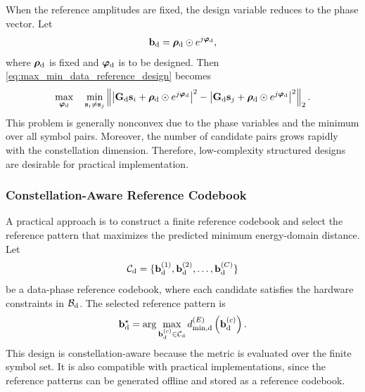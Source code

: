 \documentclass[journal]{IEEEtran}
\begin{document}
When the reference amplitudes are fixed, the design variable reduces to the phase vector. 
Let
\begin{equation}
\mathbf{b}_{\rm d}
=
\boldsymbol{\rho}_{\rm d}
\odot
e^{j\boldsymbol{\varphi}_{\rm d}},
\label{eq:data_reference_phase_parameterization}
\end{equation}
where $\boldsymbol{\rho}_{\rm d}$ is fixed and $\boldsymbol{\varphi}_{\rm d}$ is to be designed. 
Then \eqref{eq:max_min_data_reference_design} becomes
\begin{equation}
\max_{\boldsymbol{\varphi}_{\rm d}}
\quad
\min_{\mathbf{s}_i\neq\mathbf{s}_j}
\left\|
\left|
\mathbf{G}_{\rm d}\mathbf{s}_i+
\boldsymbol{\rho}_{\rm d}\odot e^{j\boldsymbol{\varphi}_{\rm d}}
\right|^2
-
\left|
\mathbf{G}_{\rm d}\mathbf{s}_j+
\boldsymbol{\rho}_{\rm d}\odot e^{j\boldsymbol{\varphi}_{\rm d}}
\right|^2
\right\|_2.
\label{eq:phase_only_data_reference_design}
\end{equation}
This problem is generally nonconvex due to the phase variables and the minimum over all symbol pairs. 
Moreover, the number of candidate pairs grows rapidly with the constellation dimension. 
Therefore, low-complexity structured designs are desirable for practical implementation.

\subsubsection{Constellation-Aware Reference Codebook}

A practical approach is to construct a finite reference codebook and select the reference pattern that maximizes the predicted minimum energy-domain distance. 
Let
\begin{equation}
\mathcal{C}_{\rm d}
=
\{
\mathbf{b}_{\rm d}^{(1)},
\mathbf{b}_{\rm d}^{(2)},
\ldots,
\mathbf{b}_{\rm d}^{(C)}
\}
\end{equation}
be a data-phase reference codebook, where each candidate satisfies the hardware constraints in $\mathcal{B}_{\rm d}$. 
The selected reference pattern is
\begin{equation}
\mathbf{b}_{\rm d}^{\star}
=
\arg\max_{\mathbf{b}_{\rm d}^{(c)}\in\mathcal{C}_{\rm d}}
d_{\min,{\rm d}}^{(E)}
\left(
\mathbf{b}_{\rm d}^{(c)}
\right).
\label{eq:data_reference_codebook_selection}
\end{equation}
This design is constellation-aware because the metric is evaluated over the finite symbol set. 
It is also compatible with practical implementations, since the reference patterns can be generated offline and stored as a reference codebook.
\end{document}
